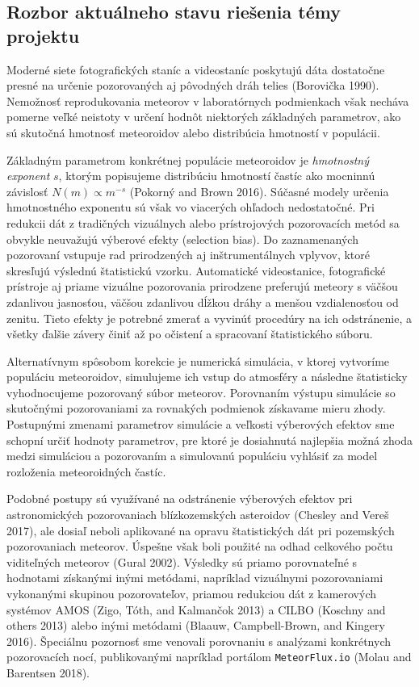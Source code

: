 \subsection{Rozbor aktuálneho stavu riešenia témy
projektu}\label{rozbor-aktuuxe1lneho-stavu-rieux161enia-tuxe9my-projektu}

Moderné siete fotografických staníc a videostaníc poskytujú dáta
dostatočne presné na určenie pozorovaných aj pôvodných dráh telies
(Borovička 1990). Nemožnosť reprodukovania meteorov v laboratórnych
podmienkach však necháva pomerne veľké neistoty v určení hodnôt
niektorých základných parametrov, ako sú skutočná hmotnosť meteoroidov
alebo distribúcia hmotností v populácii.

Základným parametrom konkrétnej populácie meteoroidov je
\emph{hmotnostný exponent} \(s\), ktorým popisujeme distribúciu
hmotností častíc ako mocninnú závislosť \(N(m) \propto m^{-s}\) (Pokorný
and Brown 2016). Súčasné modely určenia hmotnostného exponentu sú však
vo viacerých ohľadoch nedostatočné. Pri redukcii dát z tradičných
vizuálnych alebo prístrojových pozorovacích metód sa obvykle neuvažujú
výberové efekty (selection bias). Do zaznamenaných pozorovaní vstupuje
rad prirodzených aj inštrumentálnych vplyvov, ktoré skresľujú výslednú
štatistickú vzorku. Automatické videostanice, fotografické prístroje aj
priame vizuálne pozorovania prirodzene preferujú meteory s väčšou
zdanlivou jasnosťou, väčšou zdanlivou dĺžkou dráhy a menšou
vzdialenosťou od zenitu. Tieto efekty je potrebné zmerať a vyvinúť
procedúry na ich odstránenie, a všetky ďalšie závery činiť až po
očistení a spracovaní štatistického súboru.

Alternatívnym spôsobom korekcie je numerická simulácia, v ktorej
vytvoríme populáciu meteoroidov, simulujeme ich vstup do atmosféry a
následne štatisticky vyhodnocujeme pozorovaný súbor meteorov. Porovnaním
výstupu simulácie so skutočnými pozorovaniami za rovnakých podmienok
získavame mieru zhody. Postupnými zmenami parametrov simulácie a
veľkosti výberových efektov sme schopní určiť hodnoty parametrov, pre
ktoré je dosiahnutá najlepšia možná zhoda medzi simuláciou a pozorovaním
a simulovanú populáciu vyhlásiť za model rozloženia meteoroidných
častíc.

Podobné postupy sú využívané na odstránenie výberových efektov pri
astronomických pozorovaniach blízkozemských asteroidov (Chesley and
Vereš 2017), ale dosiaľ neboli aplikované na opravu štatistických dát
pri pozemských pozorovaniach meteorov. Úspešne však boli použité na
odhad celkového počtu viditeľných meteorov (Gural 2002). Výsledky sú
priamo porovnateľné s hodnotami získanými inými metódami, napríklad
vizuálnymi pozorovaniami vykonanými skupinou pozorovateľov, priamou
redukciou dát z kamerových systémov AMOS (Zigo, Tóth, and Kalmančok
2013) a CILBO (Koschny and others 2013) alebo inými metódami (Blaauw,
Campbell-Brown, and Kingery 2016). Špeciálnu pozornosť sme venovali
porovnaniu s analýzami konkrétnych pozorovacích nocí, publikovanými
napríklad portálom \texttt{MeteorFlux.io} (Molau and Barentsen 2018).

